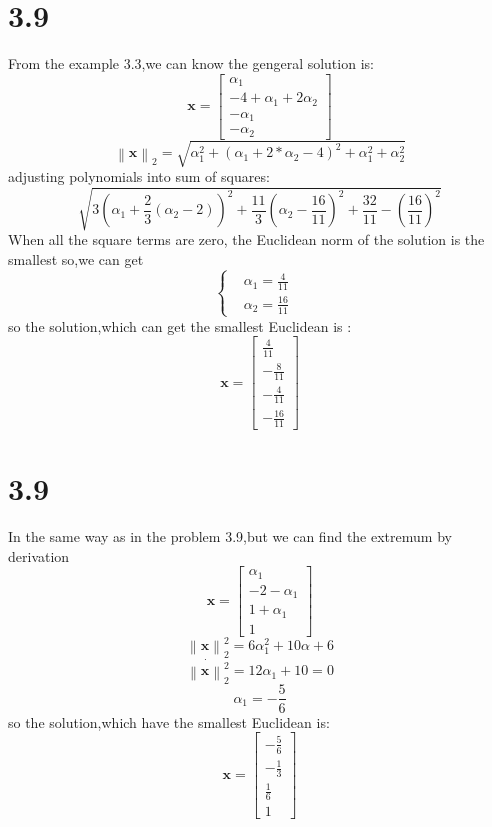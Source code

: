 \documentclass{article}
\begin{document}
\section*{3.9}
From the example 3.3,we can know the gengeral solution is:
\begin{equation*}
\boldsymbol{x}=
\left[
\begin{array}{c}
\alpha_1\\
-4+\alpha_1+2\alpha_2\\
-\alpha_1\\
-\alpha_2
\end{array}
\right]
\end{equation*}
\[\left\|\boldsymbol{x}\right\|_2=\sqrt{\alpha_1^2+(\alpha_1+2*\alpha_2-4)^2+\alpha_1^2+\alpha_2^2}\]
adjusting polynomials into sum of squares:
\[\sqrt{3(\alpha_1+\frac{2}{3}(\alpha_2-2))^2+\frac{11}{3}(\alpha_2-\frac{16}{11})^2+\frac{32}{11}-(\frac{16}{11})^2}\]
When all the square terms are zero, the Euclidean norm of the solution is the smallest
so,we can get
\[
\left\{
\begin{aligned}
&\alpha_1=\frac{4}{11}& \\   
&\alpha_2=\frac{16}{11}&
\end{aligned}
\right.
\]
so the solution,which can get the smallest Euclidean is :
\begin{equation*}
\boldsymbol{x}=
\left[
\begin{array}{c}
\frac{4}{11}\\
-\frac{8}{11}\\
-\frac{4}{11}\\
-\frac{16}{11}
\end{array}
\right]
\end{equation*}

\section*{3.9}
In the same way as in the problem 3.9,but we can find the extremum by derivation
\begin{equation*}
\boldsymbol{x}=
\left[
\begin{array}{c}
\alpha_1\\
-2-\alpha_1\\
1+\alpha_1\\
1
\end{array}
\right]
\end{equation*}
\[\left\|\boldsymbol{x}\right\|_2^2=6\alpha_1^2+10\alpha+6\]
\[\dot{\left\|\boldsymbol{x}\right\|_2^2}=12\alpha_1+10=0\]
\[\alpha_1=-\frac{5}{6}\]
so the solution,which have the smallest Euclidean is:
\begin{equation*}
\boldsymbol{x}=
\left[
\begin{array}{r}
-\frac{5}{6}\\
-\frac{1}{3}\\
\frac{1}{6}\\
1
\end{array}
\right]
\end{equation*}
\end{document}
